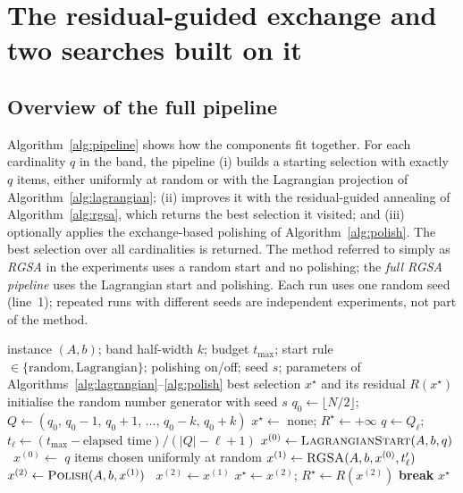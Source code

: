 \documentclass[pdflatex,sn-mathphys-num]{sn-jnl}
\theoremstyle{thmstyleone}
\theoremstyle{thmstylethree}
\begin{document}
\section{The residual-guided exchange and two searches built on it}\label{sec:method}

\subsection{Overview of the full pipeline}
Algorithm~\ref{alg:pipeline} shows how the components fit together. For each cardinality $q$ in the band, the pipeline (i) builds a starting selection with exactly $q$ items, either uniformly at random or with the Lagrangian projection of Algorithm~\ref{alg:lagrangian}; (ii) improves it with the residual-guided annealing of Algorithm~\ref{alg:rgsa}, which returns the best selection it visited; and (iii) optionally applies the exchange-based polishing of Algorithm~\ref{alg:polish}. The best selection over all cardinalities is returned. The method referred to simply as \emph{RGSA} in the experiments uses a random start and no polishing; the \emph{full RGSA pipeline} uses the Lagrangian start and polishing. Each run uses one random seed (line~1); repeated runs with different seeds are independent experiments, not part of the method.

\begin{algorithm}[t]
\caption{Full RGSA pipeline}\label{alg:pipeline}
\begin{algorithmic}[1]
\Require instance $(A,b)$; band half-width $k$; budget $t_{\max}$; start rule $\in\{\text{random},\text{Lagrangian}\}$; polishing on/off; seed $s$; parameters of Algorithms~\ref{alg:lagrangian}--\ref{alg:polish}
\Ensure best selection $x^\star$ and its residual $R(x^\star)$
\State initialise the random number generator with seed $s$
\State $q_0\gets\lfloor N/2\rfloor$; $Q\gets(q_0,\,q_0-1,\,q_0+1,\,\dots,\,q_0-k,\,q_0+k)$ 
\State $x^\star\gets$ none; $R^\star\gets+\infty$
  \State $q\gets Q_\ell$; $t_\ell\gets(t_{\max}-\text{elapsed time})/(|Q|-\ell+1)$ 
   $x^{(0)}\gets\textsc{LagrangianStart}(A,b,q)$ 
  \Else\ $x^{(0)}\gets$ $q$ items chosen uniformly at random
  \EndIf
  \State $x^{(1)}\gets\textsc{RGSA}(A,b,x^{(0)},t'_\ell)$ 
   $x^{(2)}\gets\textsc{Polish}(A,b,x^{(1)})$ 
  \Else\ $x^{(2)}\gets x^{(1)}$
  \EndIf
   $x^\star\gets x^{(2)}$; $R^\star\gets R(x^{(2)})$ \EndIf
   \textbf{break} \EndIf
\EndFor
\State \Return $x^\star$
\end{algorithmic}
\end{algorithm}
\end{document}
